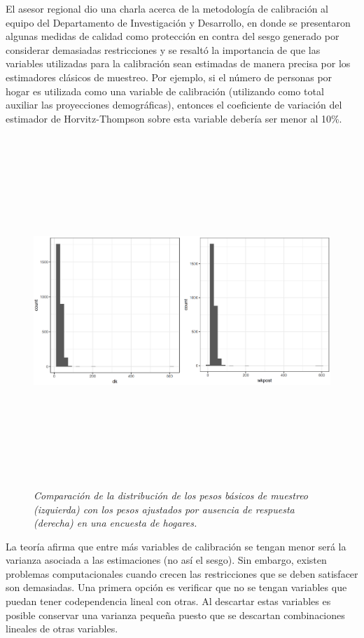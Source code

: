 \documentclass[12pt,spanish,]{book}
\begin{document}
El asesor regional dio una charla acerca de la metodología de calibración al equipo del Departamento de Investigación y Desarrollo, en donde se presentaron algunas medidas de calidad como protección en contra del sesgo generado por considerar demasiadas restricciones y se resaltó la importancia de que las variables utilizadas para la calibración sean estimadas de manera precisa por los estimadores clásicos de muestreo. Por ejemplo, si el número de personas por hogar es utilizada como una variable de calibración (utilizando como total auxiliar las proyecciones demográficas), entonces el coeficiente de variación del estimador de Horvitz-Thompson sobre esta variable debería ser menor al 10\%.

\begin{figure}
\centering
\includegraphics[width=\textwidth,height=5.20833in]{Pics/18.png}
\caption{\emph{Comparación de la distribución de los pesos básicos de muestreo (izquierda) con los pesos ajustados por ausencia de respuesta (derecha) en una encuesta de hogares.}}
\end{figure}

La teoría afirma que entre más variables de calibración se tengan menor será la varianza asociada a las estimaciones (no así el sesgo). Sin embargo, existen problemas computacionales cuando crecen las restricciones que se deben satisfacer son demasiadas. Una primera opción es verificar que no se tengan variables que puedan tener codependencia lineal con otras. Al descartar estas variables es posible conservar una varianza pequeña puesto que se descartan combinaciones lineales de otras variables.
\end{document}
